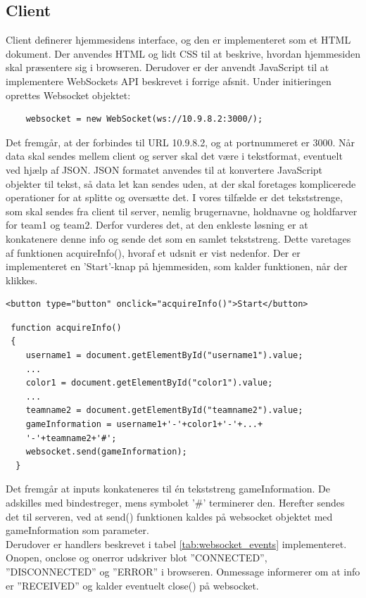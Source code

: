 \documentclass[Softwaredesign/Softwaredesign_main.tex]{subfiles}
\begin{document}
\subsection{Client}
Client definerer hjemmesidens interface, og den er implementeret som et HTML dokument. Der anvendes HTML og lidt CSS til at beskrive, hvordan hjemmesiden skal præsentere sig i browseren. Derudover er der anvendt JavaScript til at implementere WebSockets API beskrevet i forrige afsnit. Under initieringen oprettes Websocket objektet:
\begin{lstlisting}
    websocket = new WebSocket(ws://10.9.8.2:3000/);
\end{lstlisting}
Det fremgår, at der forbindes til URL 10.9.8.2, og at portnummeret er 3000. Når data skal sendes mellem client og server skal det være i tekstformat, eventuelt ved hjælp af JSON. JSON formatet anvendes til at konvertere JavaScript objekter til tekst, så data let kan sendes uden, at der skal foretages komplicerede operationer for at splitte og oversætte det. I vores tilfælde er det tekststrenge, som skal sendes fra client til server, nemlig brugernavne, holdnavne og holdfarver for team1 og team2. Derfor vurderes det, at den enkleste løsning er at konkatenere denne info og sende det som en samlet tekststreng. Dette varetages af funktionen acquireInfo(), hvoraf et udsnit er vist nedenfor. Der er implementeret en 'Start'-knap på hjemmesiden, som kalder funktionen, når der klikkes.\\
\begin{lstlisting}
<button type="button" onclick="acquireInfo()">Start</button>
\end{lstlisting}
\begin{lstlisting}
 function acquireInfo()
 {
    username1 = document.getElementById("username1").value;
    ...
    color1 = document.getElementById("color1").value;
    ...
    teamname2 = document.getElementById("teamname2").value;
    gameInformation = username1+'-'+color1+'-'+...+
    '-'+teamname2+'#';
    websocket.send(gameInformation);
  }
\end{lstlisting}
Det fremgår at inputs konkateneres til én tekststreng gameInformation. De adskilles med bindestreger, mens symbolet '\#' terminerer den. Herefter sendes det til serveren, ved at send() funktionen kaldes på websocket objektet med gameInformation som parameter.
\\Derudover er handlers beskrevet i tabel \ref{tab:websocket_events} implementeret. Onopen, onclose og onerror udskriver blot ''CONNECTED'', ''DISCONNECTED'' og ''ERROR'' i browseren. Onmessage informerer om at info er ''RECEIVED'' og kalder eventuelt close() på websocket.
\end{document}
